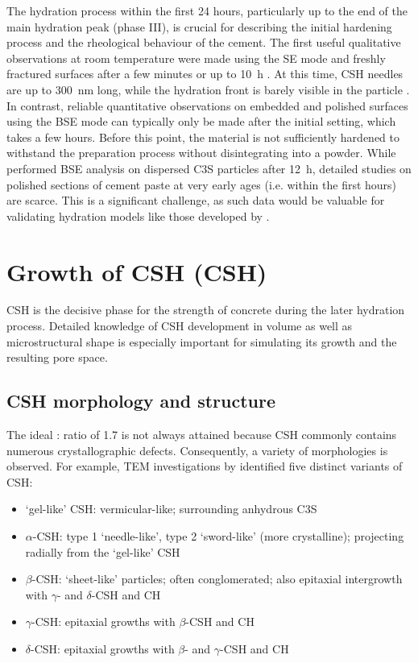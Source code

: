The hydration process within the first 24 hours, particularly up to the end of the main hydration peak (phase III), is crucial for describing the initial hardening process and the rheological behaviour of the cement.
The first useful qualitative observations at room temperature were made using the \ac{SE} mode and freshly fractured surfaces after a few minutes or up to \qty{10}{\hour} \cite{stark.2001,voland.2000,suss.2001}.
At this time, \ac{CSH} needles are up to \qty{300}{\nano\meter} long, while the hydration front is barely visible in the particle \cite{voland.2000}.
In contrast, reliable quantitative observations on embedded and polished surfaces using the \ac{BSE} mode can typically only be made after the initial setting, which takes a few hours.
Before this point, the material is not sufficiently hardened to withstand the preparation process without disintegrating into a powder.
While \textcite{neubauer.2022} performed \ac{BSE} analysis on dispersed \ac{C3S} particles after \qty{12}{\hour}, detailed studies on polished sections of cement paste at very early ages (i.e. within the first hours) are scarce.
This is a significant challenge, as such data would be valuable for validating hydration models like those developed by \textcite{nguyen-tuan.2024}.

\section{Growth of \acl*{CSH} (\acs*{CSH})}

\ac{CSH} is the decisive phase for the strength of concrete during the later hydration process.
Detailed knowledge of \ac{CSH} development in volume as well as microstructural shape is especially important for simulating its growth \cite{breugel.1997,nguyen-tuan.2023,nguyen-tuan.2024} and the resulting pore space.

\subsection{\acs*{CSH} morphology and structure}

The ideal : ratio of \num{1.7} is not always attained because \ac{CSH} commonly contains numerous crystallographic defects. 
Consequently, a variety of morphologies is observed. 
For example, \ac{TEM} investigations by \textcite{melzer.1989} identified five distinct variants of \ac{CSH}:
\begin{itemize}
    \item `gel-like' \ac{CSH}: vermicular-like; surrounding anhydrous \ac{C3S} 
    \item $\alpha$-\ac{CSH}: type 1 `needle-like', type 2 `sword-like' (more crystalline); projecting radially from the `gel-like' \ac{CSH}
    \item $\beta$-\ac{CSH}: `sheet-like' particles; often conglomerated; also epitaxial intergrowth with $\gamma$- and $\delta$-\ac{CSH} and \ac{CH}
    \item $\gamma$-\ac{CSH}: epitaxial growths with $\beta$-\ac{CSH} and \ac{CH}
    \item $\delta$-\ac{CSH}: epitaxial growths with $\beta$- and $\gamma$-\ac{CSH} and \ac{CH}
\end{itemize}

